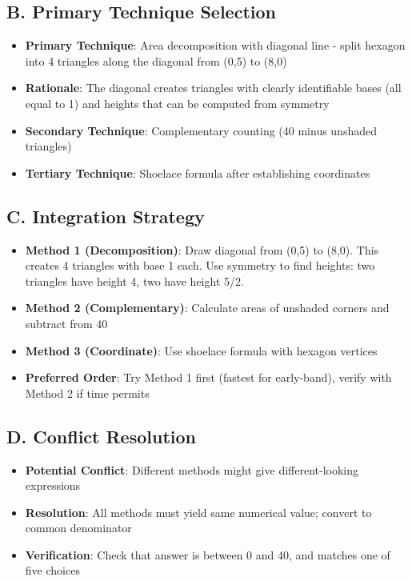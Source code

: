 \documentclass[11pt]{article}
\begin{document}
\begin{conversionbox}
\subsection*{B. Primary Technique Selection}
\begin{itemize}[leftmargin=*]
    \item \textbf{Primary Technique}: Area decomposition with diagonal line - split hexagon into 4 triangles along the diagonal from (0,5) to (8,0)
    \item \textbf{Rationale}: The diagonal creates triangles with clearly identifiable bases (all equal to 1) and heights that can be computed from symmetry
    \item \textbf{Secondary Technique}: Complementary counting (40 minus unshaded triangles)
    \item \textbf{Tertiary Technique}: Shoelace formula after establishing coordinates
\end{itemize}

\subsection*{C. Integration Strategy}
\begin{itemize}[leftmargin=*]
    \item \textbf{Method 1 (Decomposition)}: Draw diagonal from (0,5) to (8,0). This creates 4 triangles with base 1 each. Use symmetry to find heights: two triangles have height 4, two have height 5/2.
    \item \textbf{Method 2 (Complementary)}: Calculate areas of unshaded corners and subtract from 40
    \item \textbf{Method 3 (Coordinate)}: Use shoelace formula with hexagon vertices
    \item \textbf{Preferred Order}: Try Method 1 first (fastest for early-band), verify with Method 2 if time permits
\end{itemize}

\subsection*{D. Conflict Resolution}
\begin{itemize}[leftmargin=*]
    \item \textbf{Potential Conflict}: Different methods might give different-looking expressions
    \item \textbf{Resolution}: All methods must yield same numerical value; convert to common denominator
    \item \textbf{Verification}: Check that answer is between 0 and 40, and matches one of five choices
\end{itemize}
\end{conversionbox}
\end{document}
